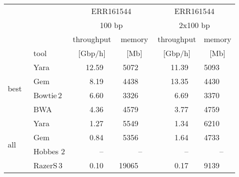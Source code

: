 \begin{tabular}{llrrrr}
  \toprule
  & \multirow{2}{*}{}  &\multicolumn{ 2 }{c}{  ERR161544 } &\multicolumn{ 2 }{c}{  ERR161544 } \\
  &&\multicolumn{2}{c}{100 bp}&\multicolumn{2}{c}{2x100 bp} \\
  \cmidrule(lr){3-4}\cmidrule(lr){5-6} 
  &  &\multicolumn{1}{c}{  throughput } &\multicolumn{1}{c}{  memory } &\multicolumn{1}{c}{  throughput } &\multicolumn{1}{c}{  memory } \\
  & tool  &\multicolumn{1}{c}{  [Gbp/h] } &\multicolumn{1}{c}{  [Mb] } &\multicolumn{1}{c}{  [Gbp/h] } &\multicolumn{1}{c}{  [Mb] } \\
  \midrule
\multirow{4}{*}{\begin{sideways}best\quad\ \end{sideways}} &  Yara  & 12.59\ \  & 5072\ \ \  & 11.39\ \  & 5093\ \ \  \\ 
    &  Gem  & 8.19\ \  & 4438\ \ \  & 13.35\ \  & 4430\ \ \  \\ 
     &  Bowtie\,2  & 6.60\ \  & 3326\ \ \  & 6.69\ \  & 3370\ \ \  \\ 
      &  BWA  & 4.36\ \  & 4579\ \ \  & 3.77\ \  & 4759\ \ \  \\ 
  \midrule\multirow{4}{*}{\begin{sideways}all\quad\ \end{sideways}} &  Yara   & 1.27\ \  & 5549\ \ \  & 1.34\ \  & 6210\ \ \  \\ 
       &  Gem   & 0.84\ \  & 5356\ \ \  & 1.64\ \  & 4733\ \ \  \\ 
        &  Hobbes 2   & --\ \  & --\ \  & --\ \  & --\ \  \\ 
         &  RazerS\,3   & 0.10\ \  & 19065\ \ \  & 0.17\ \  & 9139\ \ \  \\ 
   \bottomrule
\end{tabular}
